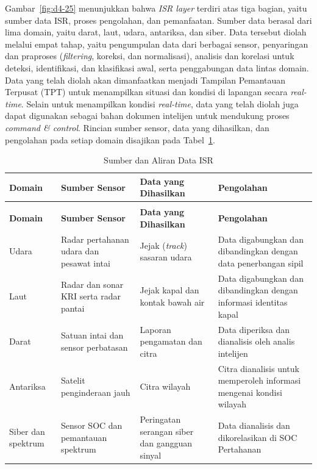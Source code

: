 Gambar~\ref{fig:d4-25} menunjukkan bahwa \textit{ISR layer} terdiri atas tiga bagian, yaitu sumber data ISR, proses pengolahan, dan pemanfaatan. Sumber data berasal dari lima domain, yaitu darat, laut, udara, antariksa, dan siber. Data tersebut diolah melalui empat tahap, yaitu pengumpulan data dari berbagai sensor, penyaringan dan praproses (\textit{filtering}, koreksi, dan normalisasi), analisis dan korelasi untuk deteksi, identifikasi, dan klasifikasi awal, serta penggabungan data lintas domain. Data yang telah diolah akan dimanfaatkan menjadi Tampilan Pemantauan Terpusat (TPT) untuk menampilkan situasi dan kondisi di lapangan secara \textit{real-time}. Selain untuk menampilkan kondisi \textit{real-time}, data yang telah diolah juga dapat digunakan sebagai bahan dokumen intelijen untuk mendukung proses \textit{command \& control}. Rincian sumber sensor, data yang dihasilkan, dan pengolahan pada setiap domain disajikan pada Tabel~\ref{tab:d4-34}.

{\small
\begin{longtable}{@{}>{\raggedright\arraybackslash}p{}>{\raggedright\arraybackslash}p{}>{\raggedright\arraybackslash}p{}>{\raggedright\arraybackslash}p{}@{}}
\caption{Sumber dan Aliran Data ISR}
\label{tab:d4-34}\\
\toprule
\textbf{Domain} & \textbf{Sumber Sensor} & \textbf{Data yang Dihasilkan} & \textbf{Pengolahan}\\
\midrule
\endfirsthead
\multicolumn{4}{@{}l}{\small\itshape \tablename\ \thetable{} (lanjutan)}\\
\toprule
\textbf{Domain} & \textbf{Sumber Sensor} & \textbf{Data yang Dihasilkan} & \textbf{Pengolahan}\\
\midrule
\endhead
\bottomrule
\endlastfoot
Udara & Radar pertahanan udara dan pesawat intai & Jejak (\textit{track}) sasaran udara & Data digabungkan dan dibandingkan dengan data penerbangan sipil\\
Laut & Radar dan sonar KRI serta radar pantai & Jejak kapal dan kontak bawah air & Data digabungkan dan dibandingkan dengan informasi identitas kapal\\
Darat & Satuan intai dan sensor perbatasan & Laporan pengamatan dan citra & Data diperiksa dan dianalisis oleh analis intelijen\\
Antariksa & Satelit penginderaan jauh & Citra wilayah & Citra dianalisis untuk memperoleh informasi mengenai kondisi wilayah\\
Siber dan spektrum & Sensor SOC dan pemantauan spektrum & Peringatan serangan siber dan gangguan sinyal & Data dianalisis dan dikorelasikan di SOC Pertahanan\\
\end{longtable}
}

